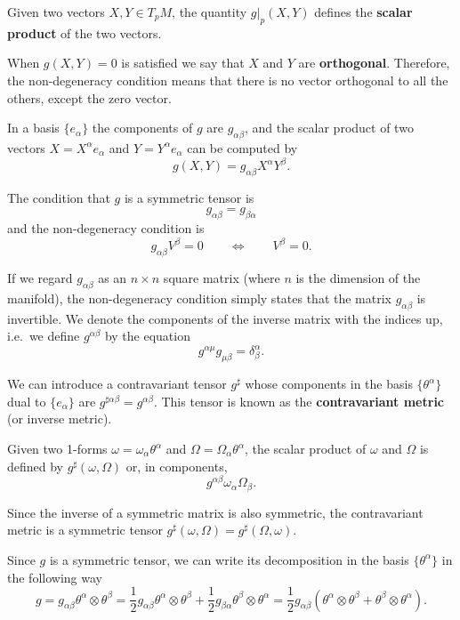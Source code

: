 \begin{points}
\item Given two vectors $X,Y\in T_pM$, the quantity $g|_p(X,Y)$ defines the \textbf{scalar product} of the two vectors.

\item When $g(X,Y)=0$ is satisfied we say that $X$ and $Y$ are \textbf{orthogonal}. Therefore, the non-degeneracy condition means that there is no vector orthogonal to all the others, except the zero vector.

\item In a basis $\{e_\alpha\}$ the components of $g$ are $g_{\alpha\beta}$, and the scalar product of two vectors $X=X^\alpha e_\alpha$ and $Y=Y^\alpha e_\alpha$ can be computed by
\[
  g(X,Y)=g_{\alpha\beta}X^\alpha Y^\beta .
\]

\item The condition that $g$ is a symmetric tensor is
\[
  g_{\alpha\beta}=g_{\beta\alpha}
\]
and the non-degeneracy condition is
\[
  g_{\alpha\beta}V^\beta=0\qquad\Longleftrightarrow\qquad V^\beta=0 .
\]

\item If we regard $g_{\alpha\beta}$ as an $n\times n$ square matrix (where $n$ is the dimension of the manifold), the non-degeneracy condition simply states that the matrix $g_{\alpha\beta}$ is invertible. We denote the components of the inverse matrix with the indices up, i.e.\ we define $g^{\alpha\beta}$ by the equation
\[
  g^{\alpha\mu}g_{\mu\beta}=\delta^\alpha_\beta .
\]

\item We can introduce a contravariant tensor $g^\sharp$ whose components in the basis $\{\theta^\alpha\}$ dual to $\{e_\alpha\}$ are $g^{\sharp\alpha\beta}=g^{\alpha\beta}$. This tensor is known as the \textbf{contravariant metric} (or inverse metric).

\item Given two 1-forms $\omega=\omega_\alpha\theta^\alpha$ and $\Omega=\Omega_\alpha\theta^\alpha$, the scalar product of $\omega$ and $\Omega$ is defined by $g^\sharp(\omega,\Omega)$ or, in components,
\[
  g^{\alpha\beta}\omega_\alpha\Omega_\beta .
\]

\item Since the inverse of a symmetric matrix is also symmetric, the contravariant metric is a symmetric tensor $g^\sharp(\omega,\Omega)=g^\sharp(\Omega,\omega)$.

\item Since $g$ is a symmetric tensor, we can write its decomposition in the basis $\{\theta^\alpha\}$ in the following way
\[
  g=g_{\alpha\beta}\theta^\alpha\otimes\theta^\beta=\frac12g_{\alpha\beta}\theta^\alpha\otimes\theta^\beta+\frac12g_{\beta\alpha}\theta^\beta\otimes\theta^\alpha=\frac12g_{\alpha\beta}\left(\theta^\alpha\otimes\theta^\beta+\theta^\beta\otimes\theta^\alpha\right).
\]


\end{points}
